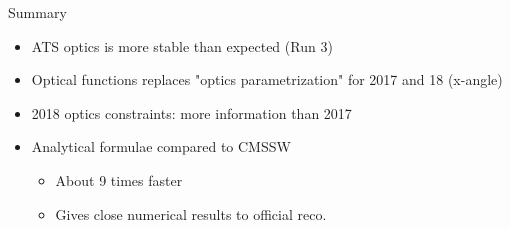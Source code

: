 \documentclass{beamer}
\begin{document}
\begin{frame}\scriptsize
	\begin{block}{Summary}
	\begin{itemize}\scriptsize
			\item ATS optics is more stable than expected (Run 3)
			\item Optical functions replaces "optics parametrization" for 2017 and 18 (x-angle)
			\item 2018 optics constraints: more information than 2017
			\item Analytical formulae compared to CMSSW 
			\begin{itemize}\scriptsize
				\item About 9 times faster
				\item Gives close numerical results to official reco.
			\end{itemize}
	\end{itemize}	
	\end{block}

\end{frame}
\end{document}
